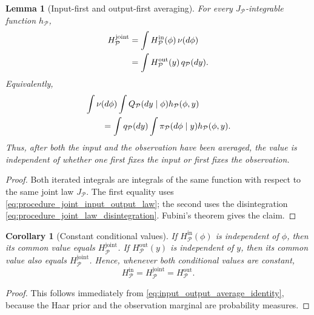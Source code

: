 \documentclass[journal]{IEEEtran}
\newtheorem{lemma}[theorem]{Lemma}
\newtheorem{corollary}[theorem]{Corollary}
\begin{document}
\begin{lemma}[Input-first and output-first averaging]
\label{lem:input_output_average_identity}
For every \(J_{\mathcal P}\)-integrable function
\(h_{\mathcal P}\),
\begin{align}
    H_{\mathcal P}^{\mathrm{joint}}
    &=
    \int H_{\mathcal P}^{\mathrm{in}}(\phi)\,\nu(d\phi)
    \notag\\
    &=
    \int H_{\mathcal P}^{\mathrm{out}}(y)\,q_{\mathcal P}(dy).
    \label{eq:input_output_average_identity}
\end{align}
Equivalently,
\begin{align}
&\int \nu(d\phi)
    \int Q_{\mathcal P}(dy\mid\phi)
    h_{\mathcal P}(\phi,y)
\notag\\
&\qquad=
\int q_{\mathcal P}(dy)
    \int \pi_{\mathcal P}(d\phi\mid y)
    h_{\mathcal P}(\phi,y).
    \label{eq:input_first_output_first_expanded}
\end{align}
Thus, after both the input and the observation have been averaged, the value is
independent of whether one first fixes the input or first fixes the observation.
\end{lemma}

\begin{proof}
Both iterated integrals are integrals of the same function with respect to the
same joint law \(J_{\mathcal P}\).  The first equality uses
\eqref{eq:procedure_joint_input_output_law}; the second uses the disintegration
\eqref{eq:procedure_joint_law_disintegration}.  Fubini's theorem gives the
claim.
\end{proof}

\begin{corollary}[Constant conditional values]
\label{cor:constant_conditional_values_joint_average}
If \(H_{\mathcal P}^{\mathrm{in}}(\phi)\) is independent of \(\phi\), then its
common value equals \(H_{\mathcal P}^{\mathrm{joint}}\).  If
\(H_{\mathcal P}^{\mathrm{out}}(y)\) is independent of \(y\), then its common
value also equals \(H_{\mathcal P}^{\mathrm{joint}}\).  Hence, whenever both
conditional values are constant,
\begin{equation}
    H_{\mathcal P}^{\mathrm{in}}
    =
    H_{\mathcal P}^{\mathrm{joint}}
    =
    H_{\mathcal P}^{\mathrm{out}}.
    \label{eq:constant_input_output_joint_values}
\end{equation}
\end{corollary}

\begin{proof}
This follows immediately from
\eqref{eq:input_output_average_identity}, because the Haar prior and the
observation marginal are probability measures.
\end{proof}
\end{document}
